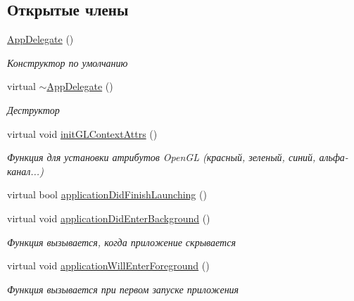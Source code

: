 \subsection*{Открытые члены}
\begin{DoxyCompactItemize}
\item 
\mbox{\label{class_app_delegate_a7d26ade6fbc9d35ecc9185792303f82d}} 
\hyperlink{class_app_delegate_a7d26ade6fbc9d35ecc9185792303f82d}{App\+Delegate} ()
\begin{DoxyCompactList}\small\item\em Конструктор по умолчанию \end{DoxyCompactList}\item 
\mbox{\label{class_app_delegate_a9f89424b5e296e3668deaa0265fc5ac1}} 
virtual \hyperlink{class_app_delegate_a9f89424b5e296e3668deaa0265fc5ac1}{$\sim$\+App\+Delegate} ()
\begin{DoxyCompactList}\small\item\em Деструктор \end{DoxyCompactList}\item 
\mbox{\label{class_app_delegate_a2de4e8ab7d04bde311684e1d4ceb2c0f}} 
virtual void \hyperlink{class_app_delegate_a2de4e8ab7d04bde311684e1d4ceb2c0f}{init\+G\+L\+Context\+Attrs} ()
\begin{DoxyCompactList}\small\item\em Функция для установки атрибутов Open\+GL (красный, зеленый, синий, альфа-\/канал...) \end{DoxyCompactList}\item 
virtual bool \hyperlink{class_app_delegate_a68cbaed49edf7581dc59a09d5062fff3}{application\+Did\+Finish\+Launching} ()
\item 
\mbox{\label{class_app_delegate_a17cb09777419781698324e0415bffd3a}} 
virtual void \hyperlink{class_app_delegate_a17cb09777419781698324e0415bffd3a}{application\+Did\+Enter\+Background} ()
\begin{DoxyCompactList}\small\item\em Функция вызывается, когда приложение скрывается \end{DoxyCompactList}\item 
\mbox{\label{class_app_delegate_ac4d653e3f74a91efef5f2def58fe3108}} 
virtual void \hyperlink{class_app_delegate_ac4d653e3f74a91efef5f2def58fe3108}{application\+Will\+Enter\+Foreground} ()
\begin{DoxyCompactList}\small\item\em Функция вызывается при первом запуске приложения \end{DoxyCompactList}\end{DoxyCompactItemize}


